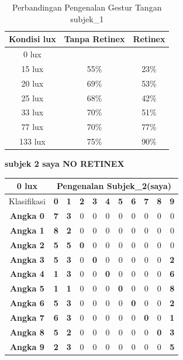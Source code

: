 \begin{table}[H]
	\caption{Perbandingan Pengenalan Gestur Tangan subjek\_1}
	\vspace{0cm}
	\centering
	\begin{tabular}{|c|c|c|}
		\hline Kondisi lux &  Tanpa Retinex &Retinex \\
		\hline 0 lux & &\\
		\hline 15 lux &55\% & 23\% \\
		\hline 20 lux &69\% &53\% \\
		\hline 25 lux &68\% &42\% \\
		\hline 33 lux &70\% &51\% \\		
		\hline 77 lux &70\% &77\% \\
		\hline  133 lux& 75\% & 90\% \\
		\hline
	\end{tabular}
\end{table}
\textbf{subjek 2 saya NO RETINEX}

\begin{tabular}{|c|c|c|c|c|c|c|c|c|c|c|}
	\hline 0 lux
	& \multicolumn{10}{|c|}{Pengenalan Subjek\_2(saya)} \\
	\hline  Klasifikasi&\textbf{0} &\textbf{1} &\textbf{2} &\textbf{3} &\textbf{4}&\textbf{5} &\textbf{6}&\textbf{7}&\textbf{8}&\textbf{9}\\
	\hline \textbf{Angka 0} &\textbf{7} &\textbf{3} &0 &0 &0 &0 &0 &0 &0 &0\\
	\hline \textbf{Angka 1} &\textbf{8} &\textbf{2} &0 &0 &0 &0 &0 &0 &0 &0\\
	\hline \textbf{Angka 2} &\textbf{5} &\textbf{5} &\textbf{0} &0 &0 &0 &0 &0 &0 &0\\
	\hline \textbf{Angka 3} &\textbf{5} &\textbf{3} &0 &\textbf{0} &0 &0 &0 &0 &0 &\textbf{2}\\
	\hline \textbf{Angka 4} &\textbf{1} &\textbf{3} &0 &0 &\textbf{0} &0 &0 &0 &0 &\textbf{6}\\
	\hline \textbf{Angka 5} &\textbf{1} &\textbf{1} &0 &0 &0 &\textbf{0} &0 &0 &0 &\textbf{8}\\
	\hline \textbf{Angka 6} &\textbf{5} &\textbf{3} &0 &0 &0 &0 &\textbf{0} &0 &0 &\textbf{2}\\
	\hline \textbf{Angka 7} &\textbf{6} &\textbf{3} &0 &0 &0 &0 &0 &\textbf{0} &0 &\textbf{1}\\
	\hline \textbf{Angka 8} &\textbf{5} &\textbf{2} &0 &0 &0 &0 &0 &0 &\textbf{0} &\textbf{3} \\
	\hline \textbf{Angka 9} &\textbf{2} &\textbf{3} &0 &0 &0 &0 &0 &0 &0 &\textbf{5} \\
	\hline
\end{tabular}

